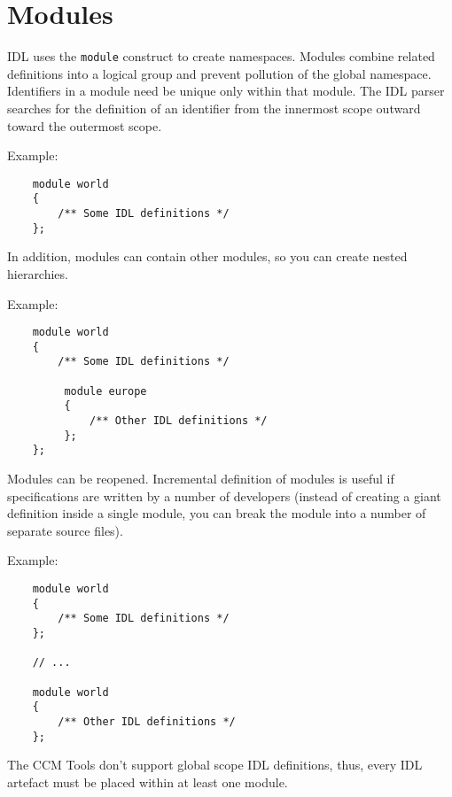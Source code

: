 \section{Modules}
IDL uses the {\tt module} construct to create namespaces.
Modules combine related definitions into a logical group and prevent pollution
of the global namespace.
Identifiers in a module need be unique only within that module.
The IDL parser searches for the definition of an identifier from the 
innermost scope outward toward the outermost scope.

\vspace{2mm}
Example:
\begin{verbatim}
    module world
    {
        /** Some IDL definitions */
    };
\end{verbatim}

In addition, modules can contain other modules, so you can create nested
hierarchies. 

\newpage
Example:
\begin{verbatim}
    module world
    {
        /** Some IDL definitions */
         
         module europe
         {
             /** Other IDL definitions */             
         };
    };
\end{verbatim}

Modules can be reopened. 
Incremental definition of modules is useful if specifications are written by a
number of developers (instead of creating a giant definition inside a single
module, you can break the module into a number of separate source files).

\vspace{2mm}
Example:
\begin{verbatim}
    module world
    {
        /** Some IDL definitions */
    };
    
    // ...
    
    module world
    {     
        /** Other IDL definitions */             
    };
\end{verbatim}

The CCM Tools don't support global scope IDL definitions, thus, every IDL artefact 
must be placed within at least one module.

